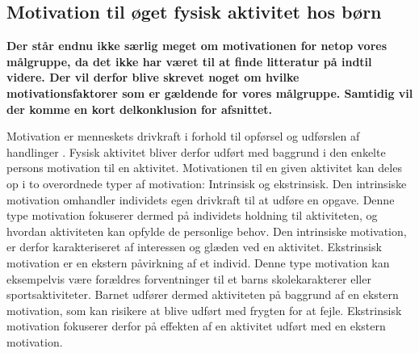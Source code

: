 \subsection{Motivation til øget fysisk aktivitet hos børn} \label{motivation_boern}
 {\color{red} \textbf{Der står endnu ikke særlig meget om motivationen for netop vores målgruppe, da det ikke har været til at finde litteratur på indtil videre. Der vil derfor blive skrevet noget om hvilke motivationsfaktorer som er gældende for vores målgruppe. Samtidig vil der komme en kort delkonklusion for afsnittet.}}


Motivation er menneskets drivkraft i forhold til opførsel og udførslen af handlinger \citep{V.Brown2007}. Fysisk aktivitet bliver derfor udført med baggrund i den enkelte persons motivation til en aktivitet. Motivationen til en given aktivitet kan deles op i to overordnede typer af motivation: Intrinsisk og ekstrinsisk. \newline
Den intrinsiske motivation omhandler individets egen drivkraft til at udføre en opgave. Denne type motivation fokuserer dermed på individets holdning til aktiviteten, og hvordan aktiviteten kan opfylde de personlige behov. Den intrinsiske motivation, er derfor karakteriseret af interessen og glæden ved en aktivitet. \newline
Ekstrinsisk motivation er en ekstern påvirkning af et individ. Denne type motivation kan eksempelvis være forældres forventninger til et barns skolekarakterer eller sportsaktiviteter. Barnet udfører dermed aktiviteten på baggrund af en ekstern motivation, som kan risikere at blive udført med frygten for at fejle. Ekstrinsisk motivation fokuserer derfor på effekten af en aktivitet udført med en ekstern motivation. \citep{J.SebireJagoR.FoxEtAl2013} 

